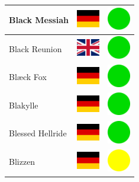 \documentclass[12pt, a4paper, twoside]{report}
\begin{document}
\begin{center}
\begin{longtable}{|p{5cm}|p{2cm}|p{2cm}|}
 Black Messiah                                              & \includegraphics[width=1cm]{../4x3/de} &   \includegraphics[width=1cm]{../likes/y} \\ \hline
 Black Reunion                                              & \includegraphics[width=1cm]{../4x3/gb} &   \includegraphics[width=1cm]{../likes/y} \\ \hline
 Blæck Fox                                                  & \includegraphics[width=1cm]{../4x3/de} &   \includegraphics[width=1cm]{../likes/y} \\ \hline
 Blakylle                                                   & \includegraphics[width=1cm]{../4x3/de} &   \includegraphics[width=1cm]{../likes/y} \\ \hline
 Blessed Hellride                                           & \includegraphics[width=1cm]{../4x3/de} &   \includegraphics[width=1cm]{../likes/y} \\ \hline
 Blizzen                                                    & \includegraphics[width=1cm]{../4x3/de} &   \includegraphics[width=1cm]{../likes/m} \\ \hline

\end{longtable}
\end{center}
\end{document}
